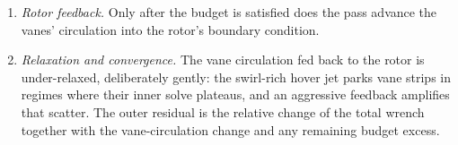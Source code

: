 \documentclass[]{aiaa-tc}%
\begin{document}
\begin{enumerate}
severe first-pass over-recovery and can never climb back, while a
symmetric bidirectional law lets the co-evolving rotor--vane pair walk
onto a runaway branch that ``converges'' with the rotor at several
times its true loading.
\item \emph{Rotor feedback.} Only after the budget is satisfied does
the pass advance the vanes' circulation into the rotor's boundary
condition.
\item \emph{Relaxation and convergence.} The vane circulation fed back
to the rotor is under-relaxed, deliberately gently: the swirl-rich
hover jet parks vane strips in regimes where their inner solve
plateaus, and an aggressive feedback amplifies that scatter. The outer
residual is the relative change of the total wrench together with the
vane-circulation change and any remaining budget excess.
\end{enumerate}
\end{document}
